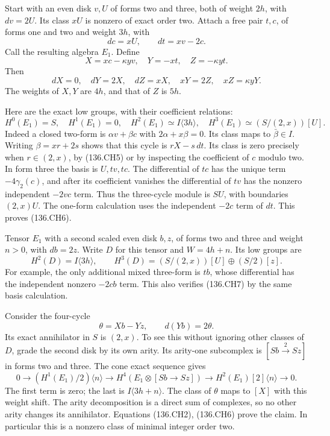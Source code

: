Start with an even disk $v,U$ of forms two and three,
both of weight $2h$, with $dv=2U$.  Its class $xU$ is
nonzero of exact order two.  Attach a free pair $t,c$,
of forms one and two and weight $3h$, with
\[
                 dc=xU,\qquad dt=xv-2c.
 \tag{136.CH3}
\]
Call the resulting algebra $E_1$.  Define
\[
 X=xc-\kappa yv,\quad Y=-xt,\quad Z=-\kappa yt.
 \tag{136.CH4}
\]
Then
\[
 dX=0,\quad dY=2X,\quad dZ=xX,\quad
 xY=2Z,\quad xZ=\kappa yY.
 \tag{136.CH5}
\]
The weights of $X,Y$ are $4h$, and that of $Z$ is $5h$.

Here are the exact low groups, with their coefficient
relations:
\[
 H^0(E_1)=S,\quad H^1(E_1)=0,\quad
 H^2(E_1)\simeq I\langle3h\rangle,\quad
 H^3(E_1)\simeq(S/(2,x))[U].
 \tag{136.CH6}
\]
Indeed a closed two-form is $\alpha v+\beta c$ with
$2\alpha+x\beta=0$.  Its class maps to $\bar\beta\in I$.
Writing $\beta=xr+2s$ shows that this cycle is
$rX-s\,dt$.  Its class is zero precisely when
$r\in(2,x)$, by (136.CH5) or by inspecting the coefficient
of $c$ modulo two.  In form three the basis is
$U,tv,tc$.  The differential of $tc$ has the unique term
$-4\gamma_2(c)$, and after its coefficient vanishes the
differential of $tv$ has the nonzero independent $-2vc$
term.  Thus the three-cycle module is $SU$, with boundaries
$(2,x)U$.  The one-form calculation uses the independent
$-2c$ term of $dt$.  This proves (136.CH6).

Tensor $E_1$ with a second scaled even disk $b,z$, of
forms two and three and weight $n>0$, with $db=2z$.
Write $D$ for this tensor and $W=4h+n$.  Its low groups are
\[
 H^2(D)=I\langle3h\rangle,
 \qquad H^3(D)=(S/(2,x))[U]\oplus(S/2)[z].
 \tag{136.CH7}
\]
For example, the only additional mixed three-form is $tb$,
whose differential has the independent nonzero $-2cb$ term.
This also verifies (136.CH7) by the same basis calculation.

Consider the four-cycle
\[
                         \theta=Xb-Yz,\qquad d(Yb)=2\theta.
 \tag{136.CH8}
\]
Its exact annihilator in $S$ is $(2,x)$.  To see this without
ignoring other classes of $D$, grade the second disk by its
own arity.  Its arity-one subcomplex is
$[Sb\xrightarrow{2}Sz]$ in forms two and three.
The cone exact sequence gives
\[
 0\longrightarrow (H^1(E_1)/2)\langle n\rangle
 \longrightarrow H^4(E_1\otimes[Sb\to Sz])
 \longrightarrow H^2(E_1)[2]\langle n\rangle\longrightarrow0.
 \tag{136.CH9}
\]
The first term is zero; the last is $I\langle3h+n\rangle$.
The class of $\theta$ maps to $[X]$ with this weight shift.
The arity decomposition
is a direct sum of complexes, so no other arity changes its
annihilator.  Equations (136.CH2), (136.CH6) prove the claim.
In particular this is a nonzero class of minimal integer
order two.


